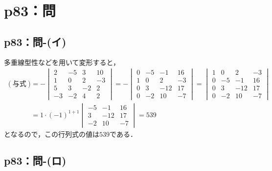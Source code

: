 \documentclass[a4paper,10pt,fleqn]{ltjsarticle}
\begin{document}
\newpage

\section*{p83：問}

\subsection*{p83：問-(イ)}

\begin{tleftbar}
  多重線型性などを用いて変形すると，
  \begin{align*}
    (\text{与式}) & = -
    \begin{vmatrix}
      2  & -5 & 3  & 10 \\
      1  & 0  & 2  & -3 \\
      5  & 3  & -2 & 2  \\
      -3 & -2 & 4  & 2
    \end{vmatrix}
    = -
    \begin{vmatrix}
      0 & -5 & -1  & 16 \\
      1 & 0  & 2   & -3 \\
      0 & 3  & -12 & 17 \\
      0 & -2 & 10  & -7
    \end{vmatrix}
    =
    \begin{vmatrix}
      1 & 0  & 2   & -3 \\
      0 & -5 & -1  & 16 \\
      0 & 3  & -12 & 17 \\
      0 & -2 & 10  & -7
    \end{vmatrix}                  \\
                & = 1 \cdot (-1)^{1+1}
    \begin{vmatrix}
      -5 & -1  & 16 \\
      3  & -12 & 17 \\
      -2 & 10  & -7
    \end{vmatrix}
    =539
  \end{align*}
  となるので，この行列式の値は$539$である．
\end{tleftbar}


\subsection*{p83：問-(ロ)}
\end{document}
